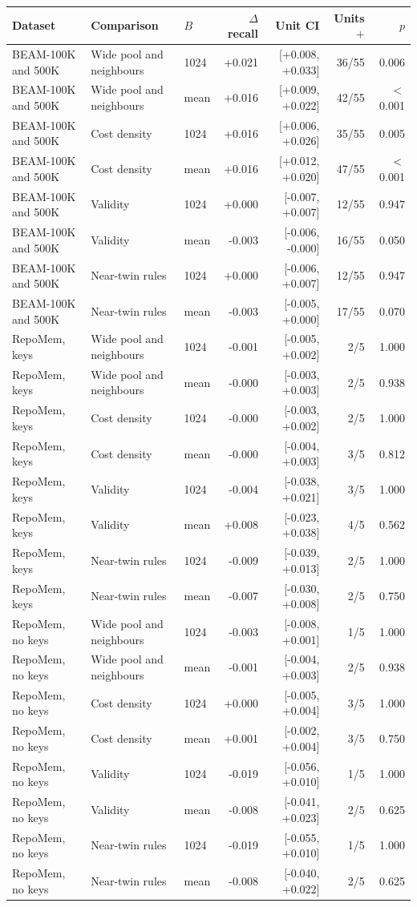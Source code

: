 \begin{tabular}{@{}lllrrrr@{}}\toprule
Dataset & Comparison & $B$ & $\Delta$ recall & Unit CI & Units $+$ & $p$ \\\midrule
BEAM-100K and 500K & Wide pool and neighbours & 1024 & +0.021 & [+0.008, +0.033] & 36/55 & 0.006 \\
BEAM-100K and 500K & Wide pool and neighbours & mean & +0.016 & [+0.009, +0.022] & 42/55 & $<$0.001 \\
BEAM-100K and 500K & Cost density & 1024 & +0.016 & [+0.006, +0.026] & 35/55 & 0.005 \\
BEAM-100K and 500K & Cost density & mean & +0.016 & [+0.012, +0.020] & 47/55 & $<$0.001 \\
BEAM-100K and 500K & Validity & 1024 & +0.000 & [-0.007, +0.007] & 12/55 & 0.947 \\
BEAM-100K and 500K & Validity & mean & -0.003 & [-0.006, -0.000] & 16/55 & 0.050 \\
BEAM-100K and 500K & Near-twin rules & 1024 & +0.000 & [-0.006, +0.007] & 12/55 & 0.947 \\
BEAM-100K and 500K & Near-twin rules & mean & -0.003 & [-0.005, +0.000] & 17/55 & 0.070 \\
\addlinespace
RepoMem, keys & Wide pool and neighbours & 1024 & -0.001 & [-0.005, +0.002] & 2/5 & 1.000 \\
RepoMem, keys & Wide pool and neighbours & mean & -0.000 & [-0.003, +0.003] & 2/5 & 0.938 \\
RepoMem, keys & Cost density & 1024 & -0.000 & [-0.003, +0.002] & 2/5 & 1.000 \\
RepoMem, keys & Cost density & mean & -0.000 & [-0.004, +0.003] & 3/5 & 0.812 \\
RepoMem, keys & Validity & 1024 & -0.004 & [-0.038, +0.021] & 3/5 & 1.000 \\
RepoMem, keys & Validity & mean & +0.008 & [-0.023, +0.038] & 4/5 & 0.562 \\
RepoMem, keys & Near-twin rules & 1024 & -0.009 & [-0.039, +0.013] & 2/5 & 1.000 \\
RepoMem, keys & Near-twin rules & mean & -0.007 & [-0.030, +0.008] & 2/5 & 0.750 \\
\addlinespace
RepoMem, no keys & Wide pool and neighbours & 1024 & -0.003 & [-0.008, +0.001] & 1/5 & 1.000 \\
RepoMem, no keys & Wide pool and neighbours & mean & -0.001 & [-0.004, +0.003] & 2/5 & 0.938 \\
RepoMem, no keys & Cost density & 1024 & +0.000 & [-0.005, +0.004] & 3/5 & 1.000 \\
RepoMem, no keys & Cost density & mean & +0.001 & [-0.002, +0.004] & 3/5 & 0.750 \\
RepoMem, no keys & Validity & 1024 & -0.019 & [-0.056, +0.010] & 1/5 & 1.000 \\
RepoMem, no keys & Validity & mean & -0.008 & [-0.041, +0.023] & 2/5 & 0.625 \\
RepoMem, no keys & Near-twin rules & 1024 & -0.019 & [-0.055, +0.010] & 1/5 & 1.000 \\
RepoMem, no keys & Near-twin rules & mean & -0.008 & [-0.040, +0.022] & 2/5 & 0.625 \\
\bottomrule\end{tabular}